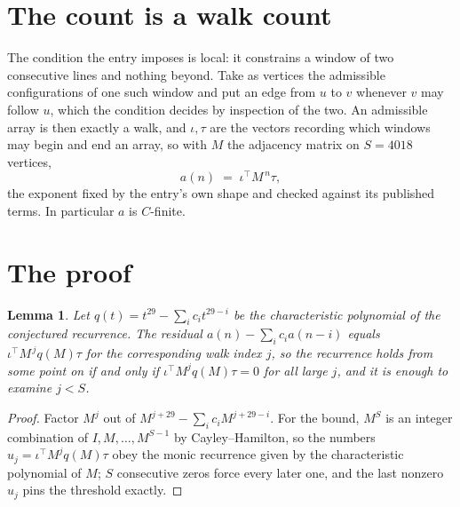 \documentclass[11pt,a4paper]{article}
\theoremstyle{plain}
\newtheorem{lemma}[theorem]{Lemma}
\theoremstyle{definition}
\begin{document}
\section{The count is a walk count}

The condition the entry imposes is local: it constrains a window of two consecutive lines and nothing beyond. Take as vertices the admissible configurations of one such window and put an edge from $u$ to $v$ whenever $v$ may follow $u$, which the condition decides by inspection of the two.
An admissible array is then exactly a walk, and $\iota,\tau$ are the vectors recording which windows may begin and end an array, so with $M$ the adjacency matrix on $S=4018$ vertices,
\[
a(n)\;=\;\iota^{\!\top}M^{\,n}\tau ,
\]
the exponent fixed by the entry's own shape and checked against its published terms. In
particular $a$ is $C$-finite.

\section{The proof}

\begin{lemma}\label{lem:crit}
Let $q(t)=t^{29}-\sum_i c_it^{29-i}$ be the characteristic polynomial of the
conjectured recurrence. The residual $a(n)-\sum_ic_ia(n-i)$ equals
$\iota^{\!\top}M^{\,j}q(M)\tau$ for the corresponding walk index $j$, so the recurrence
holds from some point on if and only if $\iota^{\!\top}M^{j}q(M)\tau=0$ for all large $j$,
and it is enough to examine $j<S$.
\end{lemma}

\begin{proof}
Factor $M^{j}$ out of $M^{j+29}-\sum_ic_iM^{j+29-i}$. For the bound, $M^{S}$
is an integer combination of $I,M,\dots,M^{S-1}$ by Cayley--Hamilton, so the numbers
$u_j=\iota^{\!\top}M^{j}q(M)\tau$ obey the monic recurrence given by the characteristic
polynomial of $M$; $S$ consecutive zeros force every later one, and the last nonzero $u_j$
pins the threshold exactly.
\end{proof}
\end{document}

